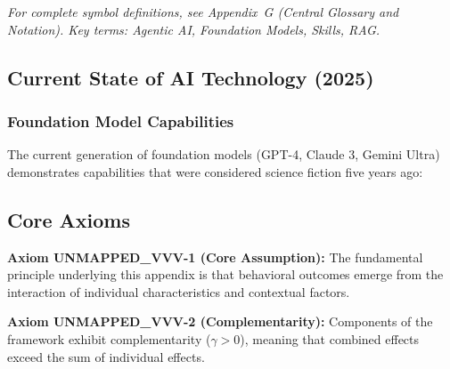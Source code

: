 
\noindent\textit{For complete symbol definitions, see Appendix~G (Central Glossary
and Notation). Key terms: Agentic AI, Foundation Models, Skills, RAG.}


\subsection{Current State of AI Technology (2025)}

\subsubsection{Foundation Model Capabilities}

The current generation of foundation models (GPT-4, Claude 3, Gemini Ultra)
demonstrates capabilities that were considered science fiction five years ago:

% 
\subsection{Core Axioms}
\label{sec:vvv-axioms}

\begin{tcolorbox}[colback=yellow!5!white,colframe=yellow!75!black,title=Axiom UNMAPPED_VVV-1: Fundamental Principle]
\textbf{Axiom UNMAPPED_VVV-1 (Core Assumption):}
The fundamental principle underlying this appendix is that behavioral outcomes
emerge from the interaction of individual characteristics and contextual factors.
\end{tcolorbox}

\begin{tcolorbox}[colback=yellow!5!white,colframe=yellow!75!black,title=Axiom UNMAPPED_VVV-2: Complementarity]
\textbf{Axiom UNMAPPED_VVV-2 (Complementarity):}
Components of the framework exhibit complementarity ($\gamma > 0$), meaning
that combined effects exceed the sum of individual effects.
\end{tcolorbox}


